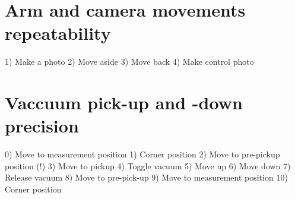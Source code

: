 \section{Arm and camera movements repeatability }

1) Make a photo
2) Move aside
3) Move back
4) Make control photo

\section{Vaccuum pick-up and -down precision}

0) Move to measurement position
1) Corner position
2) Move to pre-pickup position (!)
3) Move to pickup
4) Toggle vacuum 
5) Move up
6) Move down
7) Release vacuum
8) Move to pre-pick-up
9) Move to measurement position
10) Corner position


